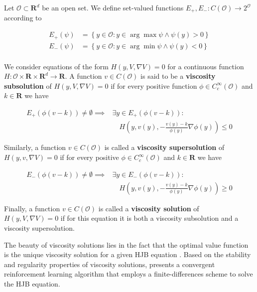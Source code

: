 \begin{definition}\label{def:viscosity}
  Let $\mathcal{O}\subset\mathbf{R}^d$ be an open set. We define
  set-valued functions $E_+, E_-: C(\mathcal{O})\to 2^{\mathcal{O}}$
  according to

  \begin{align*}
    E_+(\psi) &= \left\{y\in\mathcal{O} : y\in\arg\max\psi\land\psi(y)>0\right\}\\
    E_-(\psi) &= \left\{y\in\mathcal{O} : y\in\arg\min\psi\land\psi(y)<0\right\}\\
  \end{align*}

  We consider equations of the form $H(y, V, \nabla V) = 0$ for a
  continuous function
  $H:\mathcal{O}\times\mathbf{R}\times\mathbf{R}^d\to\mathbf{R}$.
  A function $v\in C(\mathcal{O})$ is said to be a \textbf{viscosity
    subsolution} of $H(y, V, \nabla V)=0$ if for every positive
  function $\phi\in C^\infty_c(\mathcal{O})$ and $k\in\mathbf{R}$ we
  have

  \begin{align*}
    E_+(\phi(v - k))\neq\emptyset\implies&\exists y\in E_+(\phi(v -
                                   k)):\\
    &\quad H\left(y, v(y), -\frac{v(y) - k}{\phi(y)}\nabla\phi(y)\right)\leq 0
  \end{align*}

  Similarly, a function $v\in C(\mathcal{O})$ is called a
  \textbf{viscosity supersolution} of $H(y, v, \nabla V)=0$ if for
  every positive $\phi\in C_c^\infty(\mathcal{O})$ and
  $k\in\mathbf{R}$ we have

  \begin{align*}
    E_-(\phi(v - k))\neq\emptyset\implies&\exists y\in E_-(\phi(v -
                                   k)):\\
    &\quad H\left(y, v(y), -\frac{v(y) - k}{\phi(y)}\nabla\phi(y)\right)\geq 0
  \end{align*}

  Finally, a function $v\in C(\mathcal{O})$ is called a
  \textbf{viscosity solution} of $H(y, V, \nabla V)=0$ if for this
  equation it is both a viscosity subsolution and a viscosity supersolution.
\end{definition}

The beauty of viscosity solutions lies in the fact that the optimal
value function is the unique viscosity solution for a given HJB
equation \citep{crandall1983viscosity}. Based on the stability and
regularity properties of viscosity solutions, \citet{munos1997convergent}
presents a convergent reinforcement learning algorithm that employs a
finite-differences scheme to solve the HJB equation.

